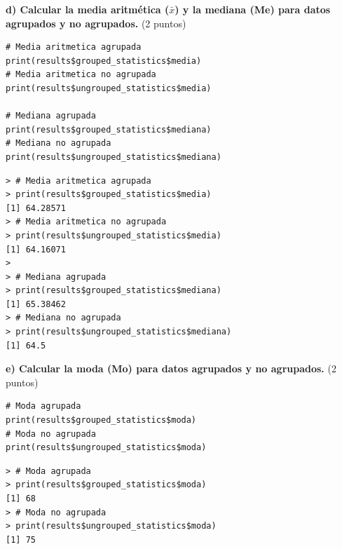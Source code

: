 \documentclass[12pt, a4paper]{article}
\begin{document}
\textbf{d) Calcular la media aritmética ($\bar{x}$) y la mediana (Me) para datos agrupados y no agrupados.} (2 puntos)

\begin{lstlisting}[caption=Mostra resultados]
# Media aritmetica agrupada
print(results$grouped_statistics$media)
# Media aritmetica no agrupada
print(results$ungrouped_statistics$media)

# Mediana agrupada
print(results$grouped_statistics$mediana)
# Mediana no agrupada
print(results$ungrouped_statistics$mediana)
\end{lstlisting}

\begin{lstlisting}[caption=Resultados en consola]
> # Media aritmetica agrupada
> print(results$grouped_statistics$media)
[1] 64.28571
> # Media aritmetica no agrupada
> print(results$ungrouped_statistics$media)
[1] 64.16071
>
> # Mediana agrupada
> print(results$grouped_statistics$mediana)
[1] 65.38462
> # Mediana no agrupada
> print(results$ungrouped_statistics$mediana)
[1] 64.5
\end{lstlisting}

\textbf{e) Calcular la moda (Mo) para datos agrupados y no agrupados.} (2 puntos)

\begin{lstlisting}[caption=Mostra resultados]
# Moda agrupada
print(results$grouped_statistics$moda)
# Moda no agrupada
print(results$ungrouped_statistics$moda)
\end{lstlisting}

\begin{lstlisting}[caption=Resultados en consola]
> # Moda agrupada
> print(results$grouped_statistics$moda)
[1] 68
> # Moda no agrupada
> print(results$ungrouped_statistics$moda)
[1] 75
\end{lstlisting}
\end{document}

